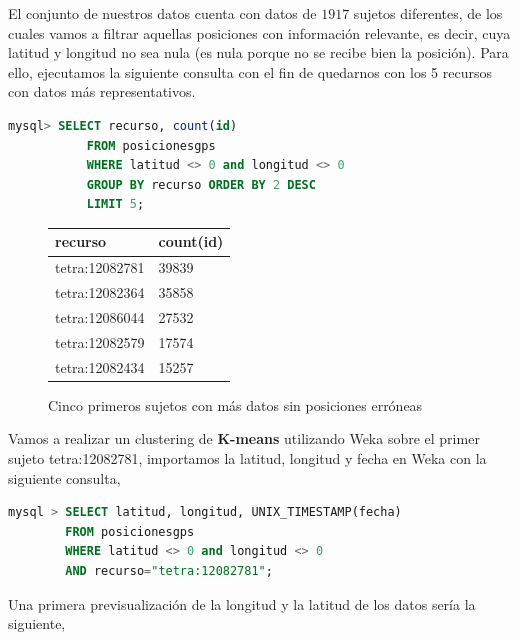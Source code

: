 \documentclass[a4paper, 12pt]{article}
\begin{document}
El conjunto de nuestros datos cuenta con datos de $1917$ sujetos diferentes, de los cuales vamos a filtrar aquellas posiciones con informaci\'on relevante, es decir, cuya latitud y longitud no sea nula (es nula porque no se recibe bien la posici\'on). Para ello, ejecutamos la siguiente consulta con el fin de quedarnos con los 5 recursos con datos m\'as representativos.

\begin{lstlisting}[language=sql, basicstyle=\small, columns=fullflexible]
mysql> SELECT recurso, count(id)
           FROM posicionesgps
           WHERE latitud <> 0 and longitud <> 0
           GROUP BY recurso ORDER BY 2 DESC 
           LIMIT 5;

\end{lstlisting}


\begin{figure}[!htbp]
	\begin{center}
		\begin{tabular}{|l | l |}
			\hline
		\rowcolor{LightCyan}
		   \hline
           recurso & count(id) \\
           \hline
           tetra:12082781 & 39839 \\
           tetra:12082364 & 35858 \\
           tetra:12086044 & 27532 \\
           tetra:12082579 & 17574 \\
		   tetra:12082434 & 15257 \\		
		   \hline
		\end{tabular}
	\caption{Cinco primeros sujetos con m\'as datos sin posiciones err\'oneas}
	\end{center}
\end{figure}


Vamos a realizar un clustering de \textbf{K-means} utilizando Weka sobre el primer sujeto tetra:12082781, importamos la latitud, longitud y fecha en Weka con la siguiente consulta,

\begin{lstlisting}[language=sql, basicstyle=\small, columns=fullflexible]
mysql > SELECT latitud, longitud, UNIX_TIMESTAMP(fecha) 
		FROM posicionesgps
		WHERE latitud <> 0 and longitud <> 0 
		AND recurso="tetra:12082781";
\end{lstlisting}

Una primera previsualizaci\'on de la longitud y la latitud de los datos ser\'ia la siguiente,\\
\end{document}
